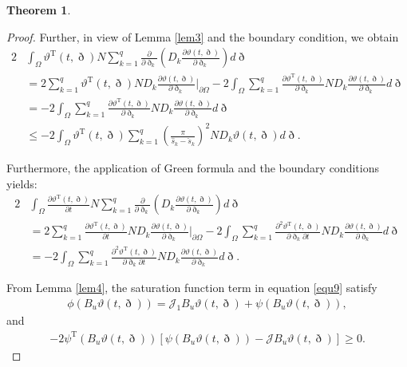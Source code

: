 \documentclass[preprint,review,fleqn,sort&compress,3p]{elsarticle}
\theoremstyle{definition}%
\newtheorem{thm}{Theorem}[section]
\begin{document}
\begin{thm}
\begin{proof}
		Further, in view of Lemma \ref{lem3} and the boundary condition, we obtain
		\begin{align}\label{equ33}
			2 &\int_\Omega \vartheta^\text{T}(t, \eth) N \sum_{k=1}^q \frac{\partial}{\partial \eth_k} \left( D_k \frac{\partial \vartheta(t, \eth)}{\partial \eth_k} \right) d\eth\nonumber\\
			&= 2 \sum_{k=1}^q \vartheta^\text{T}(t, \eth) N D_k \frac{\partial \vartheta(t, \eth)}{\partial \eth_k} \Bigg|_{\partial \Omega} - 2 \int_\Omega \sum_{k=1}^q \frac{\partial \vartheta^\text{T}(t,\eth)}{\partial \eth_k} N D_k \frac{\partial \vartheta(t, \eth)}{\partial \eth_k} d\eth\nonumber\\
			&= -2 \int_\Omega \sum_{k=1}^q \frac{\partial \vartheta^\text{T}(t, \eth)}{\partial \eth_k} N D_k \frac{\partial \vartheta(t, \eth)}{\partial \eth_k} d\eth\nonumber\\
			&\leq -2 \int_\Omega \vartheta^\text{T}(t, \eth) \sum_{k=1}^q \left( \frac{\pi}{\hat{s}_k - \check{s}_k} \right)^2 N D_k \vartheta(t, \eth) d\eth.
		\end{align}
		
		Furthermore, the application of Green formula and the boundary conditions yields:
		\begin{align}\label{equ34}
			2 &\int_\Omega \frac{\partial \vartheta^\text{T}(t, \eth)}{\partial t} N \sum_{k=1}^q \frac{\partial}{\partial \eth_k} \left( D_k \frac{\partial \vartheta(t, \eth)}{\partial \eth_k} \right) d\eth\nonumber\\
			&= 2 \sum_{k=1}^q \frac{\partial \vartheta^\text{T}(t, \eth)}{\partial t} N D_k \frac{\partial \vartheta(t, \eth)}{\partial \eth_k} \Bigg|_{\partial \Omega} - 2 \int_\Omega \sum_{k=1}^q \frac{\partial^2 \vartheta^\text{T}(t, \eth)}{\partial \eth_k \partial t} N D_k \frac{\partial \vartheta(t, \eth)}{\partial \eth_k} d\eth \nonumber\\
			&= -2 \int_\Omega \sum_{k=1}^q \frac{\partial^2 \vartheta^\text{T}(t, \eth)}{\partial \eth_k \partial t} N D_k \frac{\partial \vartheta(t, \eth)}{\partial \eth_k} d\eth.
		\end{align}
		
		From Lemma \ref{lem4}, the saturation function term in equation \eqref{equ9} satisfy
		\begin{align}
			\phi(B_u \vartheta(t, \eth)) = \mathcal{J}_1 B_u \vartheta(t, \eth) + \psi(B_u \vartheta(t, \eth)),
		\end{align}
		and
		\begin{align}
			- 2\psi^\text{T} (B_u \vartheta(t, \eth)) \left[ \psi(B_u \vartheta(t, \eth)) - \mathcal{J} B_u \vartheta(t, \eth) \right] \geq 0.
		\end{align}
		

\end{proof}
\end{thm}
\end{document}
